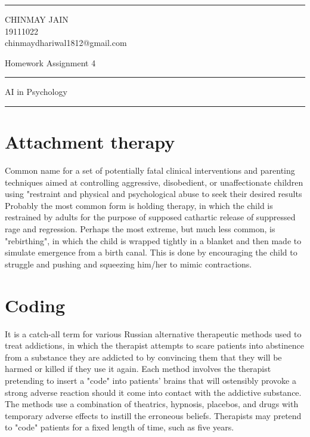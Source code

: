 \documentclass[a4paper]{article}
\begin{document}

\fancyhead[C]{}
\hrule \medskip %
\begin{minipage}{0.295\textwidth} 
\raggedright
\footnotesize
CHINMAY JAIN \hfill\\   
19111022\hfill\\
chinmaydhariwal1812@gmail.com
\end{minipage}
\begin{minipage}{0.4\textwidth} 
\centering 
\large 
Homework Assignment 4\\ 
\normalsize 

\end{minipage}
\begin{minipage}{0.295\textwidth} 
\raggedleft
\end{minipage}
\medskip\hrule 
\bigskip



\centering  \large  AI in Psychology \bigskip \hrule

\section{Attachment therapy}
Common name for a set of potentially fatal clinical interventions and parenting techniques aimed at controlling aggressive, disobedient, or unaffectionate children using "restraint and physical and psychological abuse to seek their desired results
Probably the most common form is holding therapy, in which the child is restrained by adults for the purpose of supposed cathartic release of suppressed rage and regression. Perhaps the most extreme, but much less common, is "rebirthing", in which the child is wrapped tightly in a blanket and then made to simulate emergence from a birth canal. This is done by encouraging the child to struggle and pushing and squeezing him/her to mimic contractions.

\section{Coding}
 It is a catch-all term for various Russian alternative therapeutic methods used to treat addictions, in which the therapist attempts to scare patients into abstinence from a substance they are addicted to by convincing them that they will be harmed or killed if they use it again. Each method involves the therapist pretending to insert a "code" into patients' brains that will ostensibly provoke a strong adverse reaction should it come into contact with the addictive substance. The methods use a combination of theatrics, hypnosis, placebos, and drugs with temporary adverse effects to instill the erroneous beliefs. Therapists may pretend to "code" patients for a fixed length of time, such as five years.
\end{document}
